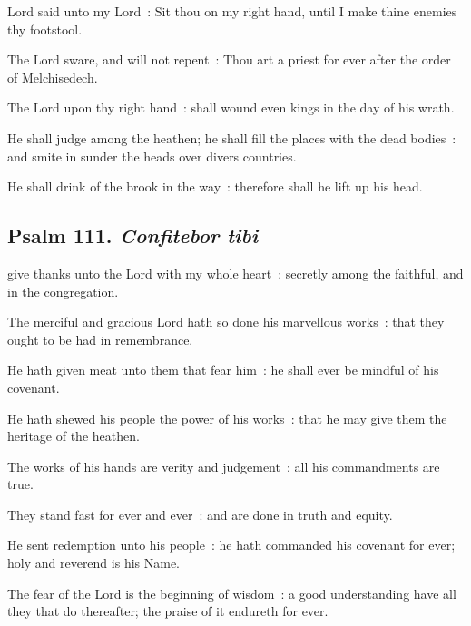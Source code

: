  Lord said unto my Lord~: Sit thou on my right hand, until I make thine enemies thy footstool.\par
{}
The Lord sware, and will not repent~: Thou art a priest for ever after the order of Melchisedech.\par
{}The Lord upon thy right hand~: shall wound even kings in the day of his wrath.\par
{}He shall judge among the heathen; he shall fill the places with the dead bodies~: and smite in sunder the heads over divers countries.\par
{}He shall drink of the brook in the way~: therefore shall he lift up his head.\par

\subsection{Psalm 111. \textit{Confitebor tibi}}


 give thanks unto the Lord with my whole heart~: secretly among the faithful, and in the congregation.\par
{}
The merciful and gracious Lord hath so done his marvellous works~: that they ought to be had in remembrance.\par
{}He hath given meat unto them that fear him~: he shall ever be mindful of his covenant.\par
{}He hath shewed his people the power of his works~: that he may give them the heritage of the heathen.\par
{}The works of his hands are verity and judgement~: all his commandments are true.\par
{}They stand fast for ever and ever~: and are done in truth and equity.\par
{}He sent redemption unto his people~: he hath commanded his covenant for ever; holy and reverend is his Name.\par
{}The fear of the Lord is the beginning of wisdom~: a good understanding have all they that do thereafter; the praise of it endureth for ever.\par



